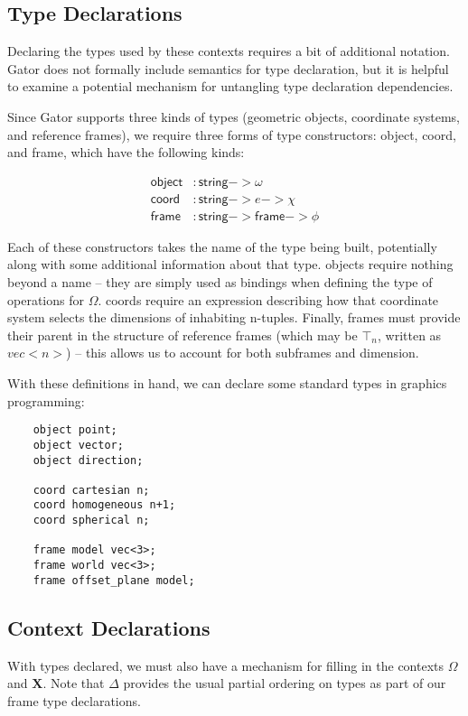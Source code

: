 \documentclass{article}
\newcommand{\Chi}{\mathbf{X}}
\begin{document}
\subsection{Type Declarations}
Declaring the types used by these contexts requires a bit of additional notation.  Gator does not formally include semantics for type  declaration, but it is helpful to examine a potential mechanism for untangling type declaration dependencies.

Since Gator supports three kinds of types (geometric objects, coordinate systems, and reference frames), we require three forms of type constructors: \textsf{object}, \textsf{coord}, and \textsf{frame}, which have the following kinds:

\begin{align*}
\mathsf{object}&:\mathsf{string}->\omega\\
\mathsf{coord}&:\mathsf{string}->e->\chi\\
\mathsf{frame}&:\mathsf{string}->\mathsf{frame}->\phi
\end{align*}

Each of these constructors takes the name of the type being built, potentially along with some additional information about that type.  \textsf{object}s require nothing beyond a name -- they are simply used as bindings when defining the type of operations for $\Omega$.  \textsf{coord}s require an expression describing how that coordinate system selects the dimensions of inhabiting n-tuples.  Finally, \textsf{frame}s must provide their parent in the structure of reference frames (which may be $\top_n$, written as $vec<n>$) -- this allows us to account for both subframes and dimension.

With these definitions in hand, we can declare some standard types in graphics programming:

\begin{lstlisting}
	object point;
	object vector;
	object direction;
	
	coord cartesian n;
	coord homogeneous n+1;
	coord spherical n;
	
	frame model vec<3>;
	frame world vec<3>;
	frame offset_plane model;
\end{lstlisting}

\subsection{Context Declarations}
With types declared, we must also have a mechanism for filling in the contexts $\Omega$ and $\Chi$.  Note that $\Delta$ provides the usual partial ordering on types as part of our \textsf{frame} type declarations.
\end{document}
